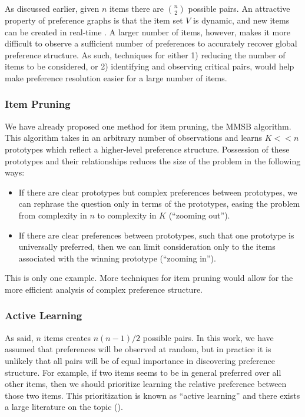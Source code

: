 As discussed earlier, given $n$ items there are $n\choose{2}$ possible pairs.
An attractive property of preference graphs is that the item set $V$ is dynamic, and new items can be created in real-time \citep{salganik:2015}.
A larger number of items, however, makes it more difficult to observe a sufficient number of preferences to accurately recover global preference structure.
As such, techniques for either 1) reducing the number of items to be considered, or 2) identifying and observing critical pairs, would help make preference resolution easier for a large number of items.

\subsubsection{Item Pruning}

We have already proposed one method for item pruning, the MMSB algorithm.
This algorithm takes in an arbitrary number of observations and learns $K << n$ prototypes which reflect a higher-level preference structure.
Possession of these prototypes and their relationships reduces the size of the problem in the following ways: 

\begin{itemize}
	\item If there are clear prototypes but complex preferences between prototypes, we can rephrase the question only in terms of the prototypes, easing the problem from complexity in $n$ to complexity in $K$ (``zooming out'').
	\item If there are clear preferences between prototypes, such that one prototype is universally preferred, then we can limit consideration only to the items associated with the winning prototype (``zooming in'').
\end{itemize}

This is only one example.
More techniques for item pruning would allow for the more efficient analysis of complex preference structure.

\subsubsection{Active Learning}

As said, $n$ items creates $n(n-1)/2$ possible pairs.
In this work, we have assumed that preferences will be observed at random, but in practice it is unlikely that all pairs will be of equal importance in discovering preference structure.
For example, if two items seems to be in general preferred over all other items, then we should prioritize learning the relative preference between those two items.
This prioritization is known as ``active learning'' and there exists a large literature on the topic (\cite{shahriari:2016}).

